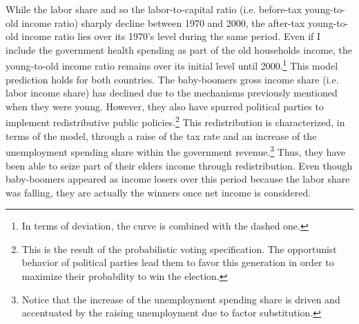 While the labor share and so the labor-to-capital ratio (i.e. before-tax young-to-old income ratio) sharply decline between 1970 and 2000, the after-tax young-to-old income ratio lies over its 1970's level during the same period. Even if I include the government health spending as part of the old households income, the young-to-old income ratio remains over its initial level until 2000.\footnote{In terms of deviation, the curve is combined with the dashed one.} This model prediction holds for both countries. The baby-boomers gross income share (i.e. labor income share) has declined due to the mechanisms previously mentioned when they were young. However, they also have spurred political parties to implement redistributive public policies.\footnote{This is the result of the probabilistic voting specification. The opportunist behavior of political parties lead them to favor this generation in order to maximize their probability to win the election.} This redistribution is characterized, in terms of the model, through a raise of the tax rate and an increase of the unemployment spending share within the government revenue.\footnote{Notice that the increase of the unemployment spending share is driven and accentuated by the raising unemployment due to factor substitution.} Thus, they have been able to seize part of their elders income through redistribution. Even though baby-boomers appeared as income losers over this period because the labor share was falling, they are actually the winners once net income is considered.

